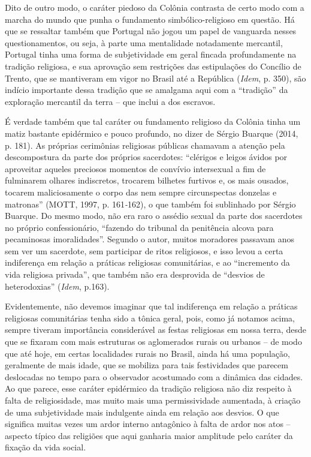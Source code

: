 Dito de outro modo, o caráter piedoso da Colônia contrasta de certo modo
com a marcha do mundo que punha o fundamento simbólico-religioso em
questão. Há que se ressaltar também que Portugal não jogou um papel de
vanguarda nesses questionamentos, ou seja, à parte uma mentalidade
notadamente mercantil, Portugal tinha uma forma de subjetividade em
geral fincada profundamente na tradição religiosa, e sua aprovação sem
restrições das estipulações do Concílio de Trento, que se mantiveram em
vigor no Brasil até a República (\emph{Idem}, p. 350), são indício
importante dessa tradição que se amalgama aqui com a ``tradição'' da
exploração mercantil da terra -- que inclui a dos escravos.

É verdade também que tal caráter ou fundamento religioso da Colônia
tinha um matiz bastante epidérmico e pouco profundo, no dizer de Sérgio
Buarque (2014, p. 181). As próprias cerimônias religiosas públicas
chamavam a atenção pela descompostura da parte dos próprios sacerdotes:
``clérigos e leigos ávidos por aproveitar aqueles preciosos momentos de
convívio intersexual a fim de fulminarem olhares indiscretos, trocarem
bilhetes furtivos e, os mais ousados, tocarem maliciosamente o corpo das
nem sempre circunspectas donzelas e matronas'' (MOTT, 1997, p.
161\emph{-}162), o que também foi sublinhado por Sérgio Buarque\emph{.}
Do mesmo modo, não era raro o assédio sexual da parte dos sacerdotes no
próprio confessionário, ``fazendo do tribunal da penitência alcova para
pecaminosas imoralidades''. Segundo o autor, muitos moradores passavam
anos sem ver um sacerdote, sem participar de ritos religiosos, e isso
levou a certa indiferença em relação a práticas religiosas comunitárias,
e ao ``incremento da vida religiosa privada'', que também não era
desprovida de ``desvios de heterodoxias'' (\emph{Idem}, p.163).

Evidentemente, não devemos imaginar que tal indiferença em relação a
práticas religiosas comunitárias tenha sido a tônica geral, pois, como
já notamos acima, sempre tiveram importância considerável as festas
religiosas em nossa terra, desde que se fixaram com mais estruturas os
aglomerados rurais ou urbanos -- de modo que até hoje, em certas
localidades rurais no Brasil, ainda há uma população, geralmente de mais
idade, que se mobiliza para tais festividades que parecem deslocadas no
tempo para o observador acostumado com a dinâmica das cidades. Ao que
parece, esse caráter epidérmico da tradição religiosa não diz respeito à
falta de religiosidade, mas muito mais uma permissividade aumentada, à
criação de uma subjetividade mais indulgente ainda em relação aos
desvios. O que significa muitas vezes um ardor interno antagônico à
falta de ardor nos atos -- aspecto típico das religiões que aqui
ganharia maior amplitude pelo caráter da fixação da vida social.

